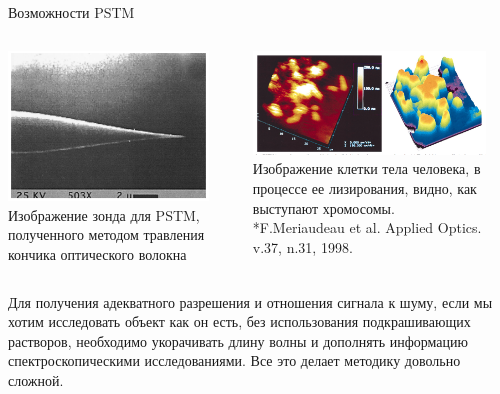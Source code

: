 \documentclass[9pt, compress, xcolor=table]{beamer}
\begin{document}
\begin{frame}{Возможности PSTM}
\begin{columns}[c]
\column{6.5cm}
\begin{center}
\includegraphics[width=0.9\textwidth]{nfm30}
\newline Изображение зонда для  PSTM, полученного методом травления кончика оптического волокна
\end{center}

\column{6.5cm}
\begin{center}
\includegraphics[width=0.9\textwidth]{nfm31}
\newline Изображение клетки тела человека, в процессе ее лизирования, видно, как выступают хромосомы. \\*\colorbox{yellow!30}{\small{F.Meriaudeau et al. Applied Optics. v.37, n.31, 1998.}}
\end{center}

\end{columns}

Для получения адекватного разрешения и отношения сигнала к шуму, если мы хотим исследовать объект как он есть, без использования подкрашивающих растворов, необходимо укорачивать длину волны и дополнять информацию спектроскопическими исследованиями. Все это делает методику довольно сложной.

\end{frame}
\end{document}
